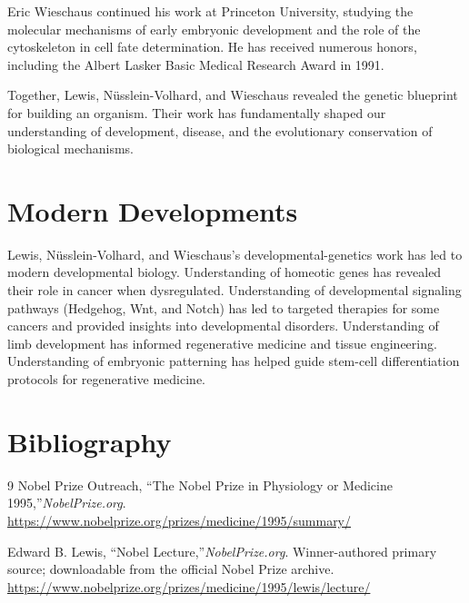 Eric Wieschaus continued his work at Princeton University, studying the molecular mechanisms of early embryonic development and the role of the cytoskeleton in cell fate determination. He has received numerous honors, including the Albert Lasker Basic Medical Research Award in 1991.

Together, Lewis, N\"usslein-Volhard, and Wieschaus revealed the genetic blueprint for building an organism. Their work has fundamentally shaped our understanding of development, disease, and the evolutionary conservation of biological mechanisms.


\section{Modern Developments}

Lewis, N\"usslein-Volhard, and Wieschaus's developmental-genetics work has led to modern developmental biology. Understanding of homeotic genes has revealed their role in cancer when dysregulated. Understanding of developmental signaling pathways (Hedgehog, Wnt, and Notch) has led to targeted therapies for some cancers and provided insights into developmental disorders. Understanding of limb development has informed regenerative medicine and tissue engineering. Understanding of embryonic patterning has helped guide stem-cell differentiation protocols for regenerative medicine.


\section{Bibliography}

\begin{thebibliography}{9}
Nobel Prize Outreach, ``The Nobel Prize in Physiology or Medicine 1995,''\emph{NobelPrize.org}.\\
\url{https://www.nobelprize.org/prizes/medicine/1995/summary/}

Edward B. Lewis, ``Nobel Lecture,''\emph{NobelPrize.org}. Winner-authored primary source; downloadable from the official Nobel Prize archive.\\
\url{https://www.nobelprize.org/prizes/medicine/1995/lewis/lecture/}
\end{thebibliography}
